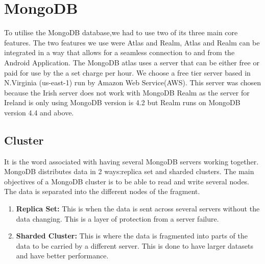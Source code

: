 \section{MongoDB}
To utilise the MongoDB database,we had to use two of its three main core features. The two features we use were Atlas and Realm, Atlas and Realm can be integrated in a way that allows for a seamless connection to and from the Android Application. The MongoDB atlas uses a server that can be either free or paid for use by the a set charge per hour. We choose a free tier server based in N.Virginia (us-east-1) run by Amazon Web Service(AWS). This server was chosen because the Irish server does not work with MongoDB Realm as the server for Ireland is only using MongoDB version is 4.2 but Realm runs on MongoDB version 4.4 and above.
\subsection{Cluster}
It is the word associated with having several MongoDB servers working together.
MongoDB distributes data in 2 ways:replica set and sharded clusters. The main objectives of a MongoDB cluster is to be able to read and write several nodes. The data is separated into the different nodes of the fragment.
\begin{enumerate}
    \item \textbf{Replica Set:}
    \newline This is when the data is sent across several servers without the data changing. This is a layer of protection from a server failure.
    \item \textbf{Sharded Cluster:}
    \newline This is where the data is fragmented into parts of the data to be carried by a different server. This is done to have larger datasets and have better performance.
\end{enumerate}

